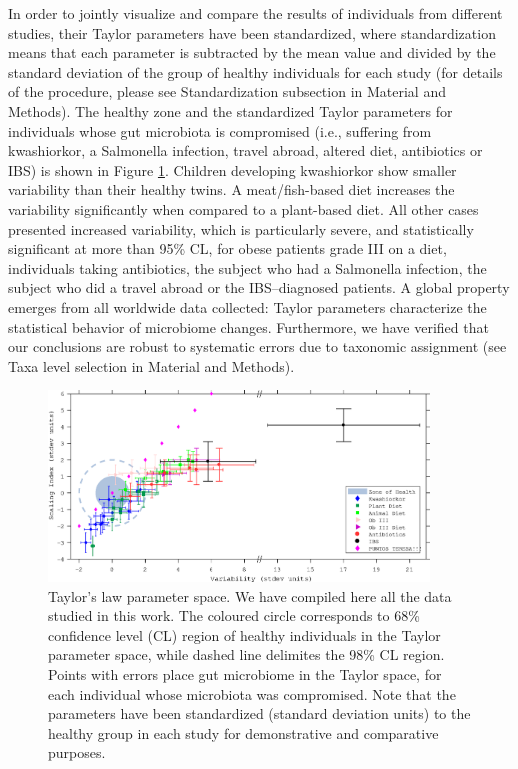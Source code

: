 In order to jointly visualize and compare the results of individuals from different studies\cite{IBS,moving,antibiotic,LEA,kwashiorkor,diet,hostlife}, their Taylor parameters have been standardized, where standardization means that each parameter is subtracted by the mean value and divided by the standard deviation of the group of healthy individuals for each study (for details of the procedure, please see Standardization subsection in Material and Methods). The healthy zone and the standardized Taylor parameters for individuals whose gut microbiota is compromised (i.e., suffering from kwashiorkor, a Salmonella infection, travel abroad, altered diet, antibiotics or IBS) is shown in Figure \ref{fig:main2}. Children developing kwashiorkor show smaller variability than their healthy twins. A meat/fish-based diet increases the variability significantly when compared to a plant-based diet. All other cases presented increased variability, which is particularly severe, and statistically significant at more than 95\% CL, for obese patients grade III on a diet, individuals taking antibiotics, the subject who had a Salmonella infection, the subject who did a travel abroad or the IBS--diagnosed patients. A global property emerges from all worldwide data collected: Taylor parameters characterize the statistical behavior of microbiome changes. Furthermore, we have verified that our conclusions are robust to systematic errors due to taxonomic assignment (see Taxa level selection in Material and Methods).

\begin{figure}
	\centering
	\includegraphics[width=0.9\textwidth]{figs/Fig2.eps}
	\caption{Taylor's law parameter space. We have compiled here all the data studied in this work. The coloured circle corresponds to 68\% confidence level (CL) region of healthy individuals in the Taylor parameter space, while dashed line delimites the 98\% CL region. Points with errors place gut microbiome in the Taylor space, for each individual whose microbiota was compromised. Note that the parameters have been standardized (standard deviation units) to the healthy group in each study for demonstrative and comparative purposes.}
	\label{fig:main2}
\end{figure}

